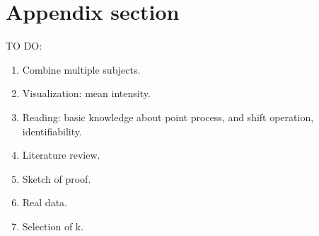 
\appendix

\section{Appendix section}\label{app}

TO DO:
\begin{enumerate}
\item Combine multiple subjects.
\item Visualization: mean intensity.
\item Reading: basic knowledge about point process, and shift operation, identifiability.
\item Literature review.
\item Sketch of proof.
\item Real data.
\item Selection of k.
\end{enumerate}


